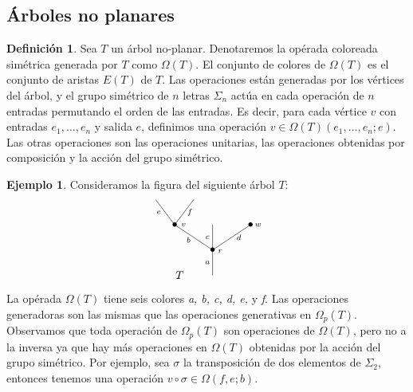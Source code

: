 \documentclass[11pt,a4paper,openright,oneside]{article}
\numberwithin{equation}{section}
\theoremstyle{definition}
\newtheorem{defi}[teo]{Definici\'on}
\newtheorem{ex}[teo]{Ejemplo}
\begin{document}
\subsection{\'Arboles no planares}
\begin{defi}
    Sea $T$ un \'arbol no-planar. Denotaremos la op\'erada coloreada sim\'etrica generada por $T$ como $\Omega(T)$. El conjunto de colores de $\Omega(T)$ es el conjunto de aristas $E(T)$ de $T$.
    Las operaciones est\'an generadas por los v\'ertices del \'arbol, y el grupo sim\'etrico de $n$ letras $\Sigma_n$ act\'ua en cada operaci\'on de $n$ entradas permutando el orden de las entradas.
    Es decir, para cada v\'ertice $v$ con entradas $e_1,\dots,e_n$ y salida $e$, definimos una operaci\'on $v\in \Omega(T)(e_1,\dots,e_n;e)$. Las otras operaciones son las operaciones unitarias, las operaciones obtenidas por composici\'on y la acci\'on del grupo sim\'etrico.
\end{defi}
\begin{ex}
    Consideramos la figura del siguiente \'arbol $T$:
    \begin{equation}
        \xy
        <0.08cm, 0cm>:
        (0.0, 0.0)*{}="1"; %
        (0.0, 10.0)*=0{\bullet}="2"; %
        (-15.0, 20.0)*=0{\bullet}="3"; %
        (-22.5, 30.0)*{}="4"; %
        (-7.5, 30.0)*{}="5"; %
        (0.0, 20.0)*{}="6"; %
        (15.0, 20.0)*=0{\bullet}="7"; %
        "1";"2" **\dir{-};
        "2";"3" **\dir{-};
        "3";"4" **\dir{-};
        "3";"5" **\dir{-};
        "2";"6" **\dir{-};
        "2";"7" **\dir{-};
        (3.0, 9.5)*=0{\scriptstyle r};
        (-11.5, 20.0)*=0{\scriptstyle v};
        (-2.0, 5.0)*=0{\scriptstyle a};
        (-9.5, 14.0)*=0{\scriptstyle b};
        (-21.3, 25.0)*=0{\scriptstyle e};
        (-9, 25.0)*=0{\scriptstyle f};
        (-2.0, 15.0)*=0{\scriptstyle c};
        (10.4, 15.0)*=0{\scriptstyle d};
        (18.0, 20.0)*=0{\scriptstyle w};
        (-13,0)*{T};
        \endxy
    \end{equation}

    La op\'erada $\Omega(T)$ tiene seis colores \textit{a, b, c, d, e,} y \textit{f}. Las operaciones generadoras son las mismas que las operaciones generativas en $\Omega_p(T)$. Observamos que toda operaci\'on de $\Omega_p(T)$ son operaciones de $\Omega(T)$, pero no a la inversa ya que hay m\'as operaciones en $\Omega(T)$ obtenidas por la acci\'on del grupo sim\'etrico.
    Por ejemplo, sea $\sigma$ la transposici\'on de dos elementos de $\Sigma_2$, entonces tenemos una operaci\'on $v\circ\sigma\in\Omega(f,e;b)$.
\end{ex}
\end{document}
